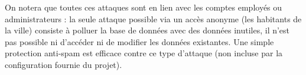 On notera que toutes ces attaques sont en lien avec les comptes employés ou administrateurs : la seule attaque possible via un accès anonyme (les habitants de la ville) consiste à polluer la base de données avec des données inutiles, il n'est pas possible ni d'accéder ni de modifier les données existantes.
Une simple protection anti-spam est efficace contre ce type d'attaque (non incluse par la configuration fournie du projet).
